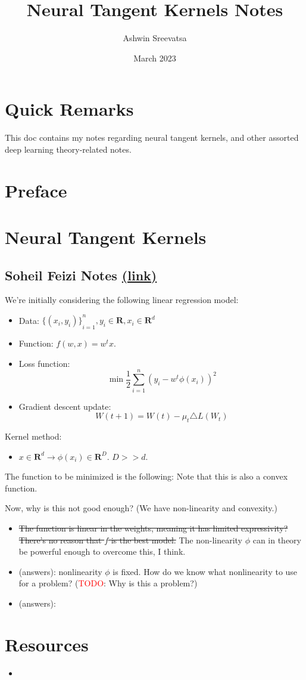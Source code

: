 \documentclass[answers,12pt]{exam}
\title{Neural Tangent Kernels Notes}
\author{Ashwin Sreevatsa}
\date{March 2023}
\begin{document}
\maketitle
\setcounter{section}{-1}

\section*{Quick Remarks}
This doc contains my notes regarding neural tangent kernels, and other assorted deep learning theory-related notes.

\section{Preface}

\section{Neural Tangent Kernels}

\subsection{Soheil Feizi Notes \href{https://www.youtube.com/watch?v=DObobAnELkU}{(link)}}

We're initially considering the following linear regression model: 
\begin{itemize}
    \item Data: ${\{(x_i,y_i)\}}_{i=1}^n, y_i \in \mathbf{R}, x_i \in \mathbf{R}^d$
    \item Function: $f(w,x) = w^t x$. 
    \item Loss function: \[\min \frac{1}{2} \sum_{i=1}^n { (y_i - w^t \phi(x_i))}^2\]
    \item Gradient descent update:
    \[ W(t+1) = W(t) - \mu_t \triangle L(W_t) \]
\end{itemize}

Kernel method:

\begin{itemize}
    \item $x \in \mathbf{R}^d \to \phi(x_i) \in \mathbf{R}^D$.
    $D >> d$.
\end{itemize}
The function to be minimized is the following:
Note that this is also a convex function.

Now, why is this not good enough?
(We have non-linearity and convexity.)
\begin{itemize}
    \item \sout{The function is linear in the weights, meaning it has limited expressivity?
    There's no reason that $f$ is the best model.}
    The non-linearity $\phi$ can in theory be powerful enough to overcome this, I think.
    \item (answers): nonlinearity $\phi$ is fixed.
    How do we know what nonlinearity to use for a problem?
    (\textcolor{red}{TODO}: Why is this a problem?)
    \item (answers):
\end{itemize}


\section{Resources}
\begin{itemize}
    \item 
\end{itemize}
\end{document}
